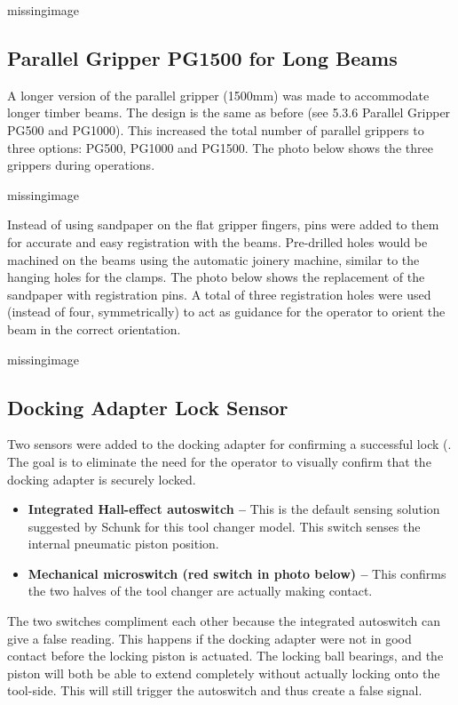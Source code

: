 missingimage

\subsection{Parallel Gripper PG1500 for Long Beams}
\label{subsection:exploration_4_parallel_gripper_pg1500_for_long_beams}

A longer version of the parallel gripper (1500mm) was made to accommodate longer timber beams. The design is the same as before (see 5.3.6 Parallel Gripper PG500 and PG1000). This increased the total number of parallel grippers to three options: PG500, PG1000 and PG1500. The photo below shows the three grippers during operations.

missingimage

Instead of using sandpaper on the flat gripper fingers, pins were added to them for accurate and easy registration with the beams. Pre-drilled holes would be machined on the beams using the automatic joinery machine, similar to the hanging holes for the clamps. The photo below shows the replacement of the sandpaper with registration pins. A total of three registration holes were used (instead of four, symmetrically) to act as guidance for the operator to orient the beam in the correct orientation. 

missingimage

\subsection{Docking Adapter Lock Sensor}
\label{subsection:exploration_4_docking_adapter_lock_sensor}

Two sensors were added to the docking adapter for confirming a successful lock (. The goal is to eliminate the need for the operator to visually confirm that the docking adapter is securely locked.

\begin{itemize}
    \item \textbf{Integrated Hall-effect autoswitch --} This is the default sensing solution suggested by Schunk for this tool changer model. This switch senses the internal pneumatic piston position.
    \item \textbf{Mechanical microswitch (red switch in photo below) --} This confirms the two halves of the tool changer are actually making contact.
\end{itemize}

The two switches compliment each other because the integrated autoswitch can give a false reading. This happens if the docking adapter were not in good contact before the locking piston is actuated. The locking ball bearings, and the piston will both be able to extend completely without actually locking onto the tool-side. This will still trigger the autoswitch and thus create a false signal. 

